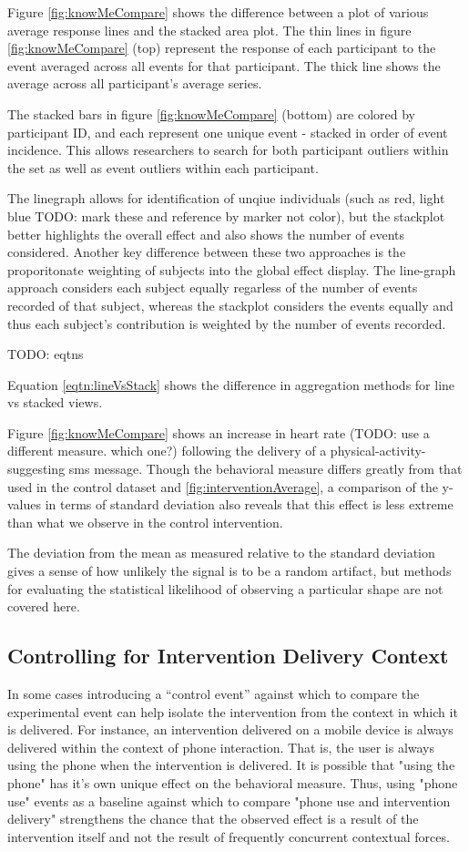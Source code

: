 \documentclass[review,journal]{vgtc}         %
\begin{document}
Figure \ref{fig:knowMeCompare} shows the difference between a plot of various average response lines and the stacked area plot.
The thin lines in figure \ref{fig:knowMeCompare} (top) represent the response of each participant to the event averaged across all events for that participant.
The thick line shows the average across all participant’s average series.

The stacked bars in figure \ref{fig:knowMeCompare} (bottom) are colored by participant ID, and each represent one unique event - stacked in order of event incidence.
This allows researchers to search for both participant outliers within the set as well as event outliers within each participant.

The linegraph allows for identification of unqiue individuals (such as red, light blue TODO: mark these and reference by marker not color), but the stackplot better highlights the overall effect and also shows the number of events considered.
Another key difference between these two approaches is the proporitonate weighting of subjects into the global effect display.
The line-graph approach considers each subject equally regarless of the number of events recorded of that subject, whereas the stackplot considers the events equally and thus each subject's contribution is weighted by the number of events recorded.

TODO: eqtns

Equation \ref{eqtn:lineVsStack} shows the difference in aggregation methods for line vs stacked views.

Figure \ref{fig:knowMeCompare} shows an increase in heart rate (TODO: use a different measure. which one?) following the delivery of a physical-activity-suggesting sms message.
Though the behavioral measure differs greatly from that used in the control dataset and \ref{fig:interventionAverage}, a comparison of the y-values in terms of standard deviation also reveals that this effect is less extreme than what we observe in the control intervention.

The deviation from the mean as measured relative to the standard deviation gives a sense of how unlikely the signal is to be a random artifact, but methods for evaluating the statistical likelihood of observing a particular shape are not covered here.

\subsection{Controlling for Intervention Delivery Context}
In some cases introducing a “control event” against which to compare the experimental event can help isolate the intervention from the context in which it is delivered.
For instance, an intervention delivered on a mobile device is always delivered within the context of phone interaction.
That is, the user is always using the phone when the intervention is delivered.
It is possible that "using the phone" has it's own unique effect on the behavioral measure.
Thus, using "phone use" events as a baseline against which to compare "phone use and intervention delivery" strengthens the chance that the observed effect is a result of the intervention itself and not the result of frequently concurrent contextual forces.
\end{document}
